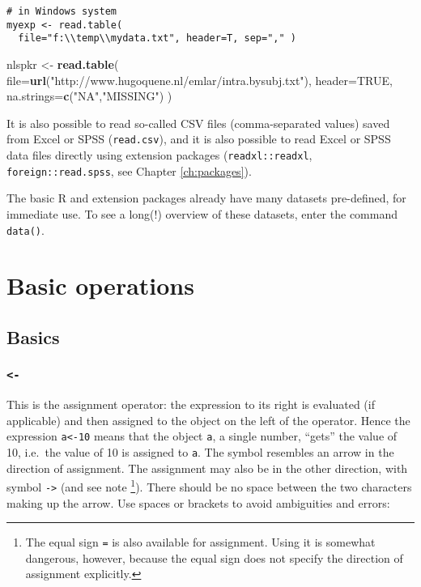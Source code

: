 \documentclass[]{book}
\newenvironment{Shaded}{\begin{snugshade}}{\end{snugshade}}
\newcommand{\DataTypeTok}[1]{\textcolor[rgb]{0.13,0.29,0.53}{#1}}
\newcommand{\KeywordTok}[1]{\textcolor[rgb]{0.13,0.29,0.53}{\textbf{#1}}}
\newcommand{\NormalTok}[1]{#1}
\newcommand{\OtherTok}[1]{\textcolor[rgb]{0.56,0.35,0.01}{#1}}
\newcommand{\StringTok}[1]{\textcolor[rgb]{0.31,0.60,0.02}{#1}}
\begin{document}
\begin{verbatim}
# in Windows system
myexp <- read.table(
  file="f:\\temp\\mydata.txt", header=T, sep="," )
\end{verbatim}

\begin{Shaded}
\begin{Highlighting}[]
\NormalTok{nlspkr <-}\StringTok{ }\KeywordTok{read.table}\NormalTok{(}
  \DataTypeTok{file=}\KeywordTok{url}\NormalTok{(}\StringTok{"http://www.hugoquene.nl/emlar/intra.bysubj.txt"}\NormalTok{),}
  \DataTypeTok{header=}\OtherTok{TRUE}\NormalTok{, }\DataTypeTok{na.strings=}\KeywordTok{c}\NormalTok{(}\StringTok{"NA"}\NormalTok{,}\StringTok{"MISSING"}\NormalTok{) )}
\end{Highlighting}
\end{Shaded}

It is also possible to read so-called CSV files (comma-separated values) saved from Excel or SPSS (\texttt{read.csv}), and it is also possible to read Excel or SPSS data files directly using extension packages (\texttt{readxl::readxl}, \texttt{foreign::read.spss}, see Chapter \ref{ch:packages}).

The basic R and extension packages already have many
datasets pre-defined, for immediate use.
To see a long(!) overview of these datasets, enter the command \texttt{data()}.

\hypertarget{ch:basicoperations}{%
\chapter{Basic operations}\label{ch:basicoperations}}

\hypertarget{sub:basics}{%
\section{Basics}\label{sub:basics}}

\hypertarget{section}{%
\subsection{\texorpdfstring{\texttt{\textless{}-}}{\textless{}-}}\label{section}}

This is the assignment operator: the expression to its right is
evaluated (if applicable) and then assigned to the object on the
left of the operator. Hence the expression
\texttt{a\textless{}-10} means that the object \texttt{a}, a single
number, ``gets'' the value of 10, i.e.~the value of 10 is assigned to \texttt{a}.
The symbol resembles
an arrow in the direction of assignment. The assignment may also be
in the other direction, with symbol \texttt{-\textgreater{}} (and see note
\footnote{The equal sign \texttt{=} is also available for assignment. Using
  it is somewhat dangerous, however, because the equal sign does not
  specify the direction of assignment explicitly.}).
There should be no space between the two characters making up the arrow.
Use spaces or brackets to avoid ambiguities and errors:
\end{document}
